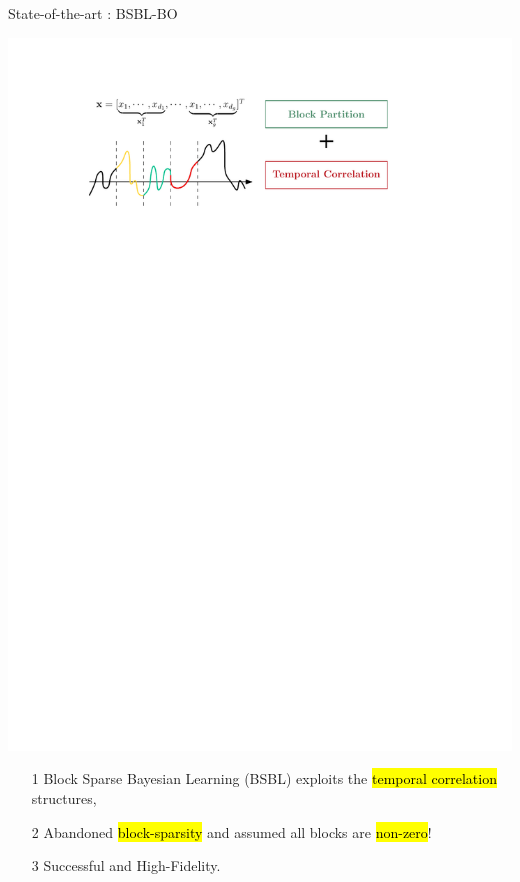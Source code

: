 \documentclass[notheorems,table]{beamer}
\begin{document}
\begin{frame}{State-of-the-art : BSBL-BO}

    {\centering\includegraphics[width=.9\linewidth]{bsbl_block_plus_intra}}

    \begin{itemize}
        \item[1] Block Sparse Bayesian Learning (BSBL) exploits the \hl{temporal correlation} structures,
        \item[2] Abandoned \hl{block-sparsity} and assumed all blocks are \hl{non-zero}!
        \item[3] Successful and High-Fidelity.
    \end{itemize}
\end{frame}
\end{document}
